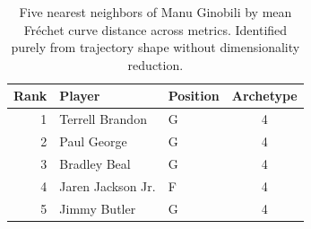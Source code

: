 \begin{table}[htbp]
  \centering\small
  \begin{tabular}{rllc}
    \toprule
    Rank & Player & Position & Archetype \\
    \midrule
    1 & Terrell Brandon & G & 4 \\
    2 & Paul George & G & 4 \\
    3 & Bradley Beal & G & 4 \\
    4 & Jaren Jackson Jr. & F & 4 \\
    5 & Jimmy Butler & G & 4 \\
    \bottomrule
  \end{tabular}
  \caption{Five nearest neighbors of Manu Ginobili by mean Fr\'{e}chet curve distance across metrics. Identified purely from trajectory shape without dimensionality reduction.}
  \label{tab:Manu_Ginobili_frechet_curve_neighbors}
\end{table}

